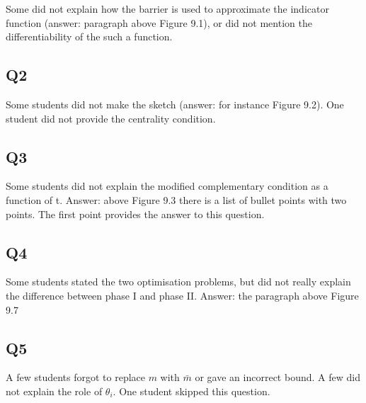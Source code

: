 Some did not explain how the barrier is used to approximate the indicator function (answer: paragraph above Figure 9.1), or did not mention the differentiability of the such a function.

\subsection*{Q2}

Some students did not make the sketch (answer: for instance Figure 9.2). One student did not provide the centrality condition.

\subsection*{Q3}

Some students did not explain the modified complementary condition as a function of t. Answer: above Figure 9.3 there is a list of bullet points with two points. The first point provides the answer to this question.

\subsection*{Q4}

Some students stated the two optimisation problems, but did not really explain the difference between phase I and phase II. Answer: the paragraph above Figure 9.7  

\subsection*{Q5}

A few students forgot to replace $m$ with $\bar m$ or gave an incorrect bound. A few did not explain the role of $\theta_i$. One student skipped this question. 